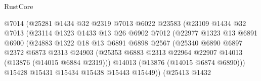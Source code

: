 \begin{lexlean}{RustCore}
\begin{coremodule}
                                @7014
                                (@25281
                                  @1434
                                  @32
                                  @2319
                                  @7013
                                  @6022
                                  @23583
                                  (@23109
                                    @1434
                                    @32
                                    @7013
                                    (@23114
                                      @1323
                                      @1433
                                      @13
                                      @26
                                      @6902
                                      @7012
                                      (@22977
                                        @1323
                                        @13
                                        @6891
                                        @6900
                                        (@24883
                                          @1322
                                          @18
                                          @13
                                          @6891
                                          @6898
                                          @2567
                                          (@25340
                                            @6890
                                            @6897
                                            @2372
                                            @6873
                                            @2313
                                            @24903
                                            (@25353
                                              @6883
                                              @2313
                                              @22964
                                              @22907
                                              @14013
                                              (@13876 (@14015 @6884 @2319)))
                                            @14013
                                            (@13876 (@14015 @6874 @6890)))
                                          @15428
                                          @15431
                                          @15434
                                          @15438
                                          @15443
                                          @15449))
                                      (@25413
                                        @1432

\end{coremodule}
\end{lexlean}
